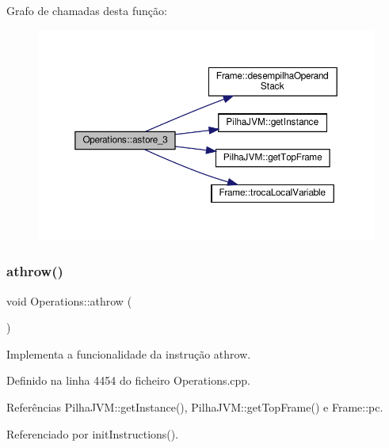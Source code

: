 Grafo de chamadas desta função\+:
\nopagebreak
\begin{figure}[H]
\begin{center}
\leavevmode
\includegraphics[width=350pt]{classOperations_ac3c02b3ff78b6222bd58bebb4f01c083_cgraph}
\end{center}
\end{figure}
\mbox{\label{classOperations_a2a5eea0fb18391bb3854dfe55c8ac5d3}} 
\subsubsection{\texorpdfstring{athrow()}{athrow()}}
{\footnotesize\ttfamily void Operations\+::athrow (\begin{DoxyParamCaption}{ }\end{DoxyParamCaption})\hspace{0.3cm}{\ttfamily [private]}}



Implementa a funcionalidade da instrução athrow. 



Definido na linha 4454 do ficheiro Operations.\+cpp.



Referências Pilha\+J\+V\+M\+::get\+Instance(), Pilha\+J\+V\+M\+::get\+Top\+Frame() e Frame\+::pc.



Referenciado por init\+Instructions().


